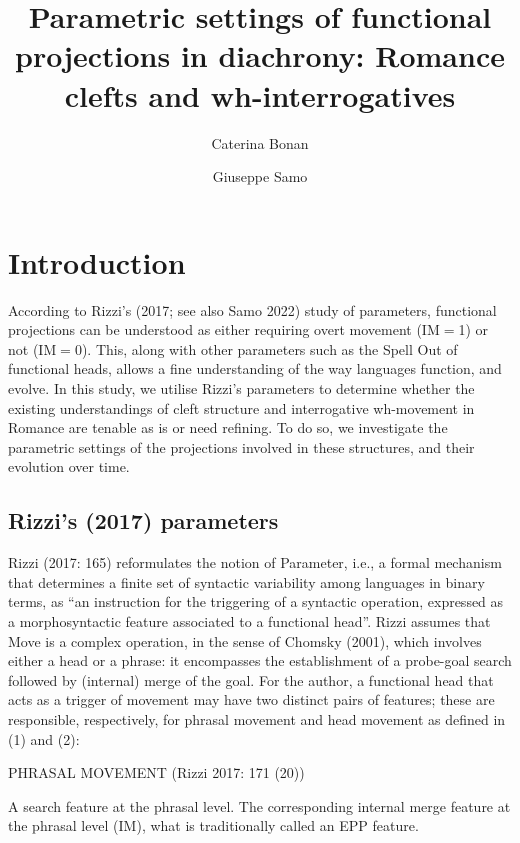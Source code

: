 \documentclass[fleqn,10pt]{wlscirep}
\title{Parametric settings of functional projections in diachrony: Romance clefts and wh-interrogatives}
\author[1,*]{Caterina Bonan}
\author[2]{Giuseppe Samo}
\affil[1]{University of Cambridge, United Kingdom.}
\affil[2]{Beijing Language and Culture University, People’s Republic of China.}
\affil[*]{Corresponding author: cb2098@cam.ac.uk}
\begin{document}
\flushbottom
\maketitle
%
%
\thispagestyle{empty}


\section*{Introduction}

According to Rizzi’s (2017; see also Samo 2022) study of parameters, functional projections can be understood as either requiring overt movement (IM$=$1) or not (IM$=$0). 
This, along with other parameters such as the Spell Out of functional heads, allows a fine understanding of the way languages function, and evolve. 
In this study, we utilise Rizzi’s parameters to determine whether the existing understandings of cleft structure and interrogative wh-movement in Romance are tenable as is or need refining. 
To do so, we investigate the parametric settings of the projections involved in these structures, and their evolution over time.

\subsection*{Rizzi's (2017) parameters}

Rizzi (2017: 165) reformulates the notion of Parameter, i.e., a formal mechanism that determines a finite set of syntactic variability among languages in binary terms, as “an instruction for the triggering of a syntactic operation, expressed as a morphosyntactic feature associated to a functional head”. 
Rizzi assumes that Move is a complex operation, in the sense of Chomsky (2001), which involves either a head or a phrase: it encompasses the establishment of a probe-goal search followed by (internal) merge of the goal. 
For the author, a functional head that acts as a trigger of movement may have two distinct pairs of features; these are responsible, respectively, for phrasal movement and head movement as defined in (1) and (2):

\begin{exe}
    \ex PHRASAL MOVEMENT (Rizzi 2017: 171 (20))
        \begin{xlist}
            \ex A search feature at the phrasal level.
            \ex The corresponding internal merge feature at the phrasal level (IM), what is traditionally called an EPP feature.
        \end{xlist}
\end{exe}
\end{document}
